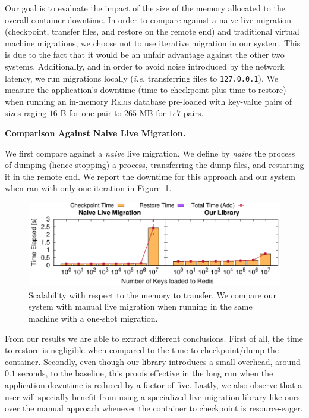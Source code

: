 Our goal is to evaluate the impact of the size of the memory allocated to the
overall container downtime.
In order to compare against a naive live migration (checkpoint, transfer files,
and restore on the remote end) and traditional virtual machine migrations, we
choose not to use iterative migration in our system.
This is due to the fact that it would be an unfair advantage against the other
two systems.
Additionally, and in order to avoid noise introduced by the network latency, we
run migrations locally (\textit{i.e.} transferring files to
\texttt{127.0.0.1}).
We measure the application's downtime (time to checkpoint plus time to restore)
when running an in-memory \textsc{Redis} database pre-loaded with key-value
pairs of sizes raging $16$ B for one pair to $265$ MB for $1e7$ pairs.

\textbf{Comparison Against Naive Live Migration.}

We first compare against a \textit{naive} live migration.
We define by \textit{naive} the process of dumping (hence stopping) a process,
transferring the dump files, and restarting it in the remote end.
We report the downtime for this approach and our system when ran with only one
iteration in Figure~\ref{fig:key-scalability}.
\begin{figure}[h!]
    \centering

    \includegraphics[width=\textwidth]{figs/key-scalability/key_scalability.pdf}
    \caption[Scalability with respect to the memory to transfer.]{Scalability
        with respect to the memory to transfer.
        We compare our system with manual live migration when running in the same
        machine with a one-shot migration.
        \label{fig:key-scalability}}
\end{figure}

From our results we are able to extract different conclusions.
First of all, the time to restore is negligible when compared to the time to
checkpoint/dump the container.
Secondly, even though our library introduces a small overhead, around $0.1$
seconds, to the baseline, this proofs effective in the long run when the
application downtime is reduced by a factor of five.
Lastly, we also observe that a user will specially benefit from using a
specialized live migration library like ours over the manual approach whenever
the container to checkpoint is resource-eager.

